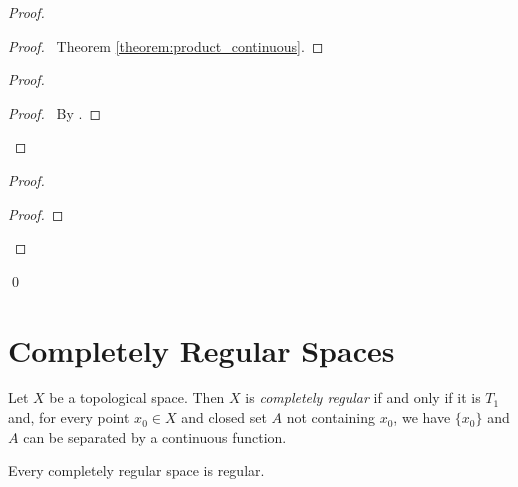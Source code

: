 \begin{proof}
    \begin{proof}
        \pf\ Theorem \ref{theorem:product_continuous}.
    \end{proof}
    \begin{proof}
        \begin{proof}
            \pf\ By .
        \end{proof}
    \end{proof}
    \begin{proof}
        \begin{proof}
        \end{proof}
    \end{proof}
    \qed
\end{proof}


\section{Completely Regular Spaces}

\begin{definition}
    Let $X$ be a topological space. Then $X$ is \emph{completely regular} if
    and only if it is $T_1$ and, for every point $x_0 \in X$ and closed set
    $A$ not containing $x_0$, we have $\{x_0\}$ and $A$ can be separated by a
    continuous function.
\end{definition}

\begin{proposition}
    Every completely regular space is regular.
\end{proposition}

